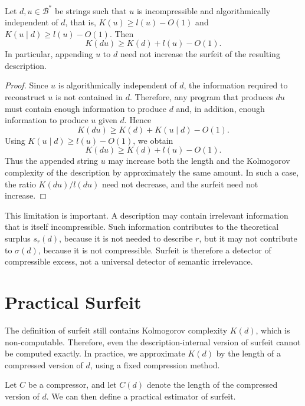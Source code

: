 \begin{proposition}
\label{prop:incompressible_noise_limitation}
Let \(d,u\in\mathcal B^\ast\) be strings such that \(u\) is incompressible and algorithmically independent of \(d\), that is, $K(u)\geq l(u)-O(1)$ and $K(u\mid d)\geq l(u)-O(1)$. Then
\[
K(du)\geq K(d)+l(u)-O(1).
\]
In particular, appending \(u\) to \(d\) need not increase the surfeit of the resulting description.
\end{proposition}

\begin{proof}
Since \(u\) is algorithmically independent of \(d\), the information required to reconstruct \(u\) is not contained in \(d\). Therefore, any program that produces \(du\) must contain enough information to produce \(d\) and, in addition, enough information to produce \(u\) given \(d\). Hence
\[
K(du)\geq K(d)+K(u\mid d)-O(1).
\]
Using \(K(u\mid d)\geq l(u)-O(1)\), we obtain
\[
K(du)\geq K(d)+l(u)-O(1).
\]
Thus the appended string \(u\) may increase both the length and the Kolmogorov complexity of the description by approximately the same amount. In such a case, the ratio \(K(du)/l(du)\) need not decrease, and the surfeit need not increase.
\end{proof}

This limitation is important. A description may contain irrelevant information that is itself incompressible. Such information contributes to the theoretical surplus \(s_r(d)\), because it is not needed to describe \(r\), but it may not contribute to \(\sigma(d)\), because it is not compressible. Surfeit is therefore a detector of compressible excess, not a universal detector of semantic irrelevance.

%
%

\section{Practical Surfeit}
\label{sec:practical_surfeit}

The definition of surfeit still contains Kolmogorov complexity \(K(d)\), which is non-computable. Therefore, even the description-internal version of surfeit cannot be computed exactly. In practice, we approximate \(K(d)\) by the length of a compressed version of \(d\), using a fixed compression method.

Let \(C\) be a compressor, and let \(C(d)\) denote the length of the compressed version of \(d\). We can then define a practical estimator of surfeit.

